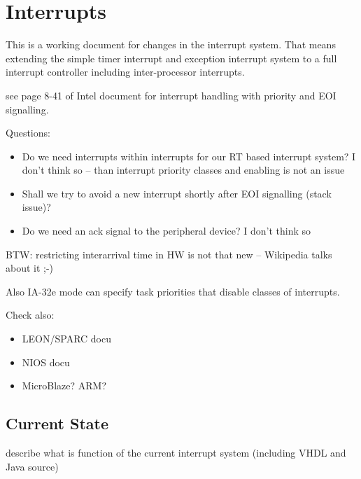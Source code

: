 \section{Interrupts}
\label{sec:interrupt}

This is a working document for changes in the interrupt system. That
means extending the simple timer interrupt and exception interrupt
system to a full interrupt controller including inter-processor
interrupts.

see page 8-41 of Intel document for interrupt handling with priority
and EOI signalling.

Questions:
\begin{itemize}
    \item Do we need interrupts within interrupts for our RT based
    interrupt system? I don't think so -- than interrupt priority
    classes and enabling is not an issue
    \item Shall we try to avoid a new interrupt shortly after EOI
    signalling (stack issue)?
    \item Do we need an ack signal to the peripheral device? I don't
    think so
\end{itemize}

BTW: restricting interarrival time in HW is not that new --
Wikipedia talks about it ;-)

Also IA-32e mode can specify task priorities that disable classes of
interrupts.

Check also:
\begin{itemize}
    \item LEON/SPARC docu
    \item NIOS docu
    \item MicroBlaze? ARM?
\end{itemize}

\subsection{Current State}

describe what is function of the current interrupt system (including
VHDL and Java source)
